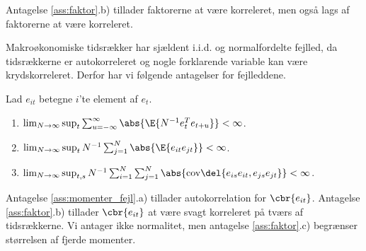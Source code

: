 Antagelse \ref{ass:faktor}.b) tillader faktorerne at være korreleret, men også lags af faktorerne at være korreleret.

Makroøkonomiske tidsrækker har sjældent i.i.d. og normalfordelte fejlled, da tidsrækkerne er autokorreleret og nogle forklarende variable kan være krydskorreleret. 
Derfor har vi følgende antagelser for fejlleddene.
%
\begin{ass} \label{ass:momenter_fejl}
Lad \(e_{it}\) betegne \(i\)'te element af \(e_t\).
\begin{enumerate}[label=\alph*)]
\item \(\lim_{N \rightarrow \infty} \sup_t \sum_{u = - \infty}^\infty \abs{\E{N^{-1} e_t^T e_{t+u}}} < \infty\).
\item \(\lim_{N \rightarrow \infty} \sup_t N^{-1} \sum_{j = 1}^N \abs{\E{e_{it} e_{jt}}} < \infty\).
\item \(\lim_{N \rightarrow \infty} \sup_{t,s} N^{-1} \sum_{i=1}^N \sum_{j=1}^N \abs{\text{cov}\del{e_{is} e_{it}, e_{js} e_{jt}}} < \infty\).
\end{enumerate}
\end{ass}
%
Antagelse \ref{ass:momenter_fejl}.a) tillader autokorrelation for \(\cbr{e_{it}}\).
Antagelse \ref{ass:faktor}.b) tillader \(\cbr{e_{it}}\) at være svagt korreleret på tværs af tidsrækkerne.
Vi antager ikke normalitet, men antagelse \ref{ass:faktor}.c) begrænser størrelsen af fjerde momenter.

